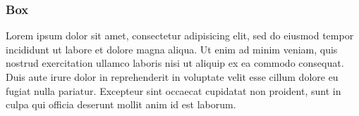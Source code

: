 \documentclass[twoside,11pt]{article}
\newenvironment{boxedlaw}[1]
    {\begin{Sbox}\begin{minipage}{#1}\setcounter{mpfootnote}{\value{footnote}}}
            {\end{minipage}\end{Sbox}\begin{center}\shadowbox{\TheSbox}
            \setcounter{footnote}{\value{mpfootnote}}\end{center}}
\begin{document}
\subsubsection{Box}

\begin{boxedlaw}{\textwidth}
    Lorem ipsum dolor sit amet, consectetur adipisicing elit, sed do eiusmod tempor incididunt ut labore et dolore magna aliqua. Ut enim ad minim veniam, quis nostrud exercitation ullamco laboris nisi ut aliquip ex ea commodo consequat. Duis aute irure dolor in reprehenderit in voluptate velit esse cillum dolore eu fugiat nulla pariatur. Excepteur sint occaecat cupidatat non proident, sunt in culpa qui officia deserunt mollit anim id est laborum.
\end{boxedlaw}

\newpage
\end{document}
